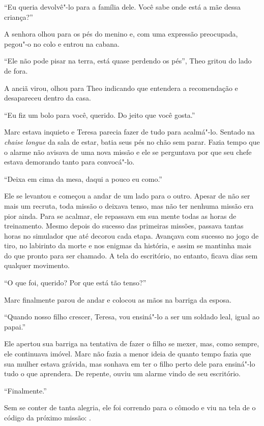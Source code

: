 ``Eu queria devolvê"-lo para a família dele. Você sabe onde está a mãe
dessa criança?''

A senhora olhou para os pés do menino e, com uma expressão preocupada,
pegou"-o no colo e entrou na cabana.

``Ele não pode pisar na terra, está quase perdendo os pés'', Theo gritou
do lado de fora.

A anciã virou, olhou para Theo indicando que entendera a recomendação e
desapareceu dentro da casa.

\asterisc


``Eu fiz um bolo para você, querido. Do jeito que você gosta.''

Marc estava inquieto e Teresa parecia fazer de tudo para acalmá"-lo.
Sentado na \emph{chaise longue} da sala de estar, batia seus pés no chão
sem parar. Fazia tempo que o alarme não avisava de uma nova missão e ele
se perguntava por que seu chefe estava demorando tanto para convocá"-lo.

``Deixa em cima da mesa, daqui a pouco eu como.''

Ele se levantou e começou a andar de um lado para o outro. Apesar de não
ser mais um recruta, toda missão o deixava tenso, mas não ter nenhuma
missão era pior ainda. Para se acalmar, ele repassava em sua mente
todas as horas de treinamento. Mesmo depois do sucesso das primeiras
missões, passava tantas horas no simulador que até decorou cada etapa.
Avançava com sucesso no jogo de tiro, no labirinto da morte e nos
enigmas da história, e assim se mantinha mais do que pronto para ser
chamado. A tela do escritório, no entanto, ficava dias sem qualquer
movimento.

``O que foi, querido? Por que está tão tenso?''

Marc finalmente parou de andar e colocou as mãos na barriga da esposa.

``Quando nosso filho crescer, Teresa, vou ensiná"-lo a ser um soldado
leal, igual ao papai.''

Ele apertou sua barriga na tentativa de fazer o filho se mexer, mas,
como sempre, ele continuava imóvel. Marc não fazia a menor ideia de
quanto tempo fazia que sua mulher estava grávida, mas sonhava em ter
o filho perto dele para ensiná"-lo tudo o que aprendera. De repente,
ouviu um alarme vindo de seu escritório.

``Finalmente.''

Sem se conter de tanta alegria, ele foi correndo para o cômodo e viu na
tela de  o código da próximo missão: .

